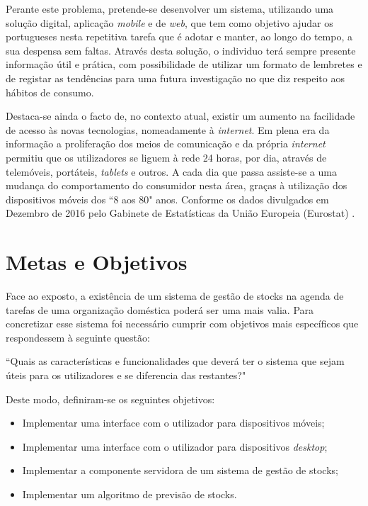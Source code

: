 Perante este problema, pretende-se desenvolver um sistema, utilizando uma solução digital, aplicação \textit{mobile} e de \textit{web}, que tem como objetivo ajudar os portugueses nesta repetitiva tarefa que é adotar e manter, ao longo do tempo, a sua despensa sem faltas.
Através desta solução, o individuo terá sempre presente informação útil e prática, com possibilidade de utilizar um formato de lembretes e de registar as tendências para uma futura investigação no que diz respeito aos hábitos de consumo.

Destaca-se ainda o facto de, no contexto atual, existir um aumento na facilidade de acesso às novas tecnologias, nomeadamente à \textit{internet}. Em plena era da informação a proliferação dos meios de comunicação e da própria \textit{internet} permitiu que os utilizadores se liguem à rede 24 horas, por dia, através de telemóveis, portáteis, \textit{tablets} e outros. A cada dia que passa assiste-se a uma mudança do comportamento do consumidor nesta área, graças à utilização dos dispositivos móveis dos ``8 aos 80" anos. Conforme os dados divulgados em Dezembro de 2016 pelo Gabinete de Estatísticas da União Europeia (Eurostat) \cite{eurostat:internetAccess2016}.

%
%
\section{Metas e Objetivos} \label{sec12}
Face ao exposto, a existência de um sistema de gestão de stocks na agenda de tarefas de uma organização doméstica poderá ser uma mais valia. Para concretizar esse sistema foi necessário cumprir com objetivos mais específicos que respondessem à seguinte questão: 

``Quais as características e funcionalidades que deverá ter o sistema que sejam úteis para os utilizadores e se diferencia das restantes?"

Deste modo, definiram-se os seguintes objetivos:
\begin{itemize} \itemsep 0pt
	\item Implementar uma interface com o utilizador para dispositivos móveis;
	\item Implementar uma interface com o utilizador para dispositivos \textit{desktop};
	\item Implementar a componente servidora de um sistema de gestão de stocks;
	\item Implementar um algoritmo de previsão de stocks.
\end{itemize}

